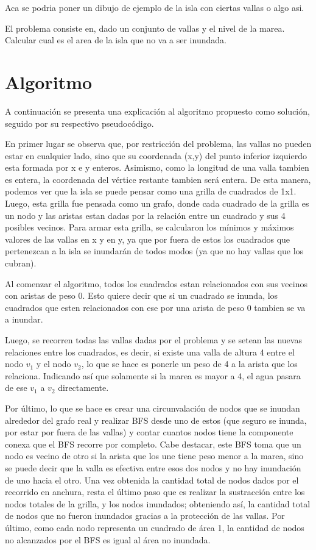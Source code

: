 \documentclass[a4paper, 12pt]{article}
\begin{document}
Aca se podria poner un dibujo de ejemplo de la isla con ciertas vallas o algo asi.

El problema consiste en, dado un conjunto de vallas y el nivel de la marea. Calcular cual es el area de la isla que no va a ser inundada.

\section*{Algoritmo}

A continuaci\'on se presenta una explicaci\'on al algoritmo propuesto como soluci\'on, seguido por su respectivo pseudoc\'odigo.

En primer lugar se observa que, por restricci\'on del problema, las vallas no pueden estar en cualquier lado, sino que su coordenada (x,y) del punto inferior izquierdo esta formada por x e y enteros. Asimismo, como la longitud de una valla tambien es entera, la coordenada del v\'ertice restante tambien ser\'a entera. De esta manera, podemos ver que la isla se puede pensar como una grilla de cuadrados de 1x1. Luego, esta grilla fue pensada como un grafo, donde cada cuadrado de la grilla es un nodo y las aristas estan dadas por la relaci\'on entre un cuadrado y sus 4 posibles vecinos. Para armar esta grilla, se calcularon los m\'inimos y m\'aximos valores de las vallas en x y en y, ya que por fuera de estos los cuadrados que pertenezcan a la isla se inundar\'an de todos modos (ya que no hay vallas que los cubran).

Al comenzar el algoritmo, todos los cuadrados estan relacionados con sus vecinos con aristas de peso 0. Esto quiere decir que si un cuadrado se inunda, los cuadrados que esten relacionados con ese por una arista de peso 0 tambien se va a inundar. 

Luego, se recorren todas las vallas dadas por el problema y se setean las nuevas relaciones entre los cuadrados, es decir, si existe una valla de altura 4 entre el nodo $v_1$ y el nodo $v_2$, lo que se hace es ponerle un peso de 4 a la arista que los relaciona. Indicando as\'i que solamente si la marea es mayor a 4, el agua pasara de ese $v_1$ a $v_2$ directamente.

Por \'ultimo, lo que se hace es crear una circunvalaci\'on de nodos que se inundan alrededor del grafo real y realizar BFS desde uno de estos (que seguro se inunda, por estar por fuera de las vallas) y contar cuantos nodos tiene la componente conexa que el BFS recorre por completo. Cabe destacar, este BFS toma que un nodo es vecino de otro si la arista que los une tiene peso menor a la marea, sino se puede decir que la valla es efectiva entre esos dos nodos y no hay inundaci\'on de uno hacia el otro. Una vez obtenida la cantidad total de nodos dados por el recorrido en anchura, resta el \'ultimo paso que es realizar la sustracci\'on entre los nodos totales de la grilla, y los nodos inundados; obteniendo as\'i, la cantidad total de nodos que no fueron inundados gracias a la protecci\'on de las vallas. Por \'ultimo, como cada nodo representa un cuadrado de \'area 1, la cantidad de nodos no alcanzados por el BFS es igual al \'area no inundada.
\end{document}
